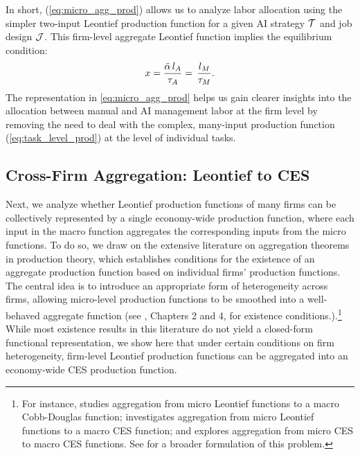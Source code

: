 In short, (\ref{eq:micro_agg_prod}) allows us to analyze labor allocation using the simpler two-input Leontief production function for a given AI strategy \( \mathcal{T} \) and job design \( \mathcal{J} \).
This firm-level aggregate Leontief function implies the equilibrium condition:
\begin{equation}
x=\frac{\bar{\alpha}\,l_{A}}{\tau_{A}}
=\,\frac{l_{M}}{\tau_{M}}.
\label{eq:micro_fixed_proportions}
\end{equation}
The representation in \eqref{eq:micro_agg_prod} helps us gain clearer insights into the allocation between manual and AI management labor at the firm level by removing the need to deal with the complex, many-input production function (\ref{eq:task_level_prod}) at the level of individual tasks.



\subsection{Cross-Firm Aggregation: Leontief to CES}

Next, we analyze whether Leontief production functions of many firms can be collectively represented by a single economy-wide production function, where each input in the macro function aggregates the corresponding inputs from the micro functions. 
To do so, we draw on the extensive literature on aggregation theorems in production theory, which establishes conditions for the existence of an aggregate production function based on individual firms' production functions.
The central idea is to introduce an appropriate form of heterogeneity across firms, allowing micro-level production functions to be smoothed into a well-behaved aggregate function (see \cite{sato1975production}, Chapters 2 and 4, for existence conditions.).\footnote{
For instance, \cite{houthakker1955pareto} studies aggregation from micro Leontief functions to a macro Cobb-Douglas function; \cite{levhari1968note} investigates aggregation from micro Leontief functions to a macro CES function; and \cite{sato1969micro} explores aggregation from micro CES to macro CES functions. 
See \cite{baqaee2019foundations} for a broader formulation of this problem.}
While most existence results in this literature do not yield a closed-form functional representation, we show here that under certain conditions on firm heterogeneity, firm-level Leontief production functions can be aggregated into an economy-wide CES production function.

